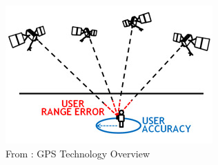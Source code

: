 \begin{figure}
    \includegraphics[scale=0.5]{figures/gps-how.jpg}
    \caption{From \cite{gpsGov}: GPS Technology Overview}
\label{fig:gps:how}
\end{figure}
